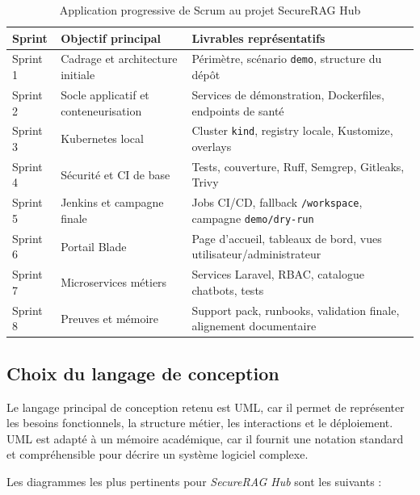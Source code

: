 \begin{table}[htbp]
    \centering
    \begin{tabular}{|p{2.2cm}|p{5.2cm}|p{6.2cm}|}
        \hline
        \textbf{Sprint} & \textbf{Objectif principal} & \textbf{Livrables représentatifs} \\
        \hline
        Sprint 1 & Cadrage et architecture initiale & Périmètre, scénario \texttt{demo}, structure du dépôt \\
        \hline
        Sprint 2 & Socle applicatif et conteneurisation & Services de démonstration, Dockerfiles, endpoints de santé \\
        \hline
        Sprint 3 & Kubernetes local & Cluster \texttt{kind}, registry locale, Kustomize, overlays \\
        \hline
        Sprint 4 & Sécurité et CI de base & Tests, couverture, Ruff, Semgrep, Gitleaks, Trivy \\
        \hline
        Sprint 5 & Jenkins et campagne finale & Jobs CI/CD, fallback \texttt{/workspace}, campagne \texttt{demo/dry-run} \\
        \hline
        Sprint 6 & Portail Blade & Page d'accueil, tableaux de bord, vues utilisateur/administrateur \\
        \hline
        Sprint 7 & Microservices métiers & Services Laravel, RBAC, catalogue chatbots, tests \\
        \hline
        Sprint 8 & Preuves et mémoire & Support pack, runbooks, validation finale, alignement documentaire \\
        \hline
    \end{tabular}
    \caption{Application progressive de Scrum au projet SecureRAG Hub}
    \label{tab:sprints_securerag}
\end{table}

\subsection{Choix du langage de conception}

Le langage principal de conception retenu est UML, car il permet de représenter les besoins fonctionnels, la structure métier, les interactions et le déploiement. UML est adapté à un mémoire académique, car il fournit une notation standard et compréhensible pour décrire un système logiciel complexe.

Les diagrammes les plus pertinents pour \textit{SecureRAG Hub} sont les suivants :

